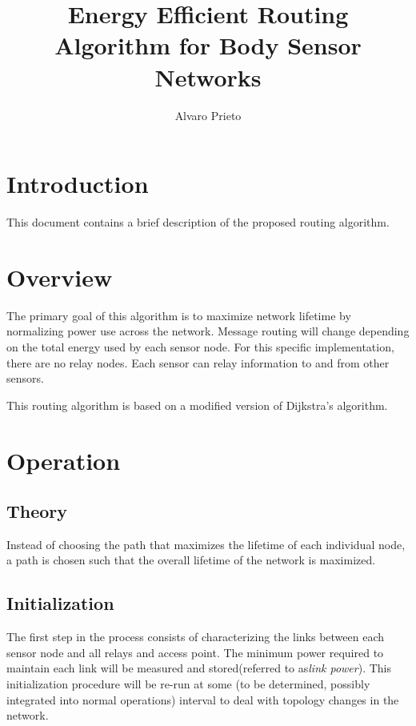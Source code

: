 \documentclass{article}
\begin{document}
\title{Energy Efficient Routing Algorithm for Body Sensor Networks}
\author{Alvaro Prieto}
\maketitle

\pagebreak

\section{Introduction}
This document contains a brief description of the proposed routing algorithm.

\section{Overview}
The primary goal of this algorithm is to maximize network lifetime by normalizing power use across the network. Message routing will change depending on the total energy used by each sensor node. For this specific implementation, there are no relay nodes. Each sensor can relay information to and from other sensors.

This routing algorithm is based on a modified version of Dijkstra's algorithm.

\section{Operation}

\subsection{Theory}
Instead of choosing the path that maximizes the lifetime of each individual node, a path is chosen such that the overall lifetime of the network is maximized.

\subsection{Initialization}
The first step in the process consists of characterizing the links between each sensor node and all relays and access point. The minimum power required to maintain each link will be measured and stored(referred to as\emph{link power}). This initialization procedure will be re-run at some (to be determined, possibly integrated into normal operations) interval to deal with topology changes in the network.
\end{document}

